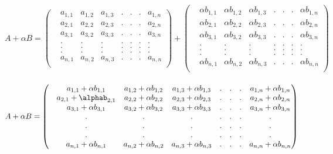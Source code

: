 \documentclass[45pt]{article}
\begin{document}
\begin{enumerate}
    $  A+ \alpha B =\begin{pmatrix}
    & a_{1,1} & a_{1,2} & a_{1,3} &.&.&.& a_{1,n}  \\
    & a_{2,1} & a_{2,2} & a_{2,3} &.&.&.& a_{2,n}  \\
    & a_{3,1} & a_{3,2} & a_{3,3} &.&.&.& a_{3,n}  \\
        & . & . & . &.&.&.&.\\
        & . & . & . &.&.&.&.\\
        & . & . & . &.&.&.&.\\
        & a_{n,1} & a_{n,2} & a_{n,3} &.&.&.& a_{n,n}  \\
        \end{pmatrix} + 
        \begin{pmatrix}
        & \alpha b_{1,1} & \alpha b_{1,2} & \alpha b_{1,3} &.&.&.& \alpha b_{1,n}  \\
        & \alpha b_{2,1} & \alpha b_{2,2} & \alpha b_{2,3} &.&.&.& \alpha b_{2,n}  \\
        & \alpha b_{3,1} & \alpha b_{3,2} & \alpha b_{3,3} &.&.&.& \alpha b_{3,n}  \\
        & . & . & . &.&.&.&.\\
        & . & . & . &.&.&.&.\\
        & . & . & . &.&.&.&.\\
        & \alpha b_{n,1} & \alpha b_{n,2} & \alpha b_{n,3} &.&.&.& \alpha b_{n,n}  \\
        \end{pmatrix}$\\\\

$A+ \alpha B =
    \begin{pmatrix}
        
        & a_{1,1} +\alpha b_{1,1} & a_{1,2} + \alpha b_{1,2} & a_{1,3} + \alpha b_{1,3} &.&.&.& a_{1,n} +\alpha b_{1,n}  \\
        & a_{2,1}  + \alphab_{2,1} & a_{2,2} + \alpha b_{2,2} & a_{2,3} + \alpha b_{2,3} &.&.&.& a_{2,n} +\alpha b_{2,n}  \\
        & a_{3,1} + \alpha b_{3,1} & a_{3,2} + \alpha b_{3,2} & a_{3,3} + \alpha b_{3,3}  &.&.&.& a_{3,n} +\alpha b_{3,n}  \\
        & . & . & . &.&.&.&.\\
        & . & . & . &.&.&.&.\\
        & . & . & . &.&.&.&.\\
        & a_{n,1}+\alpha b_{n,1} & a_{n,2} + \alpha b_{n,2} & a_{n,3}+\alpha b_{n,3} &.&.&.& a_{n,n}+\alpha b_{n,n}  \\
    \end{pmatrix}\\\\$


\end{enumerate}
\end{document}
